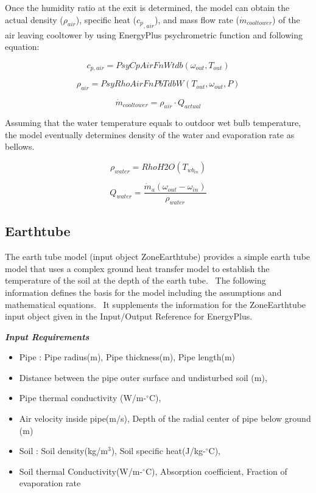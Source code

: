 Once the humidity ratio at the exit is determined, the model can obtain the actual density (\({\rho_{air}}\)), specific heat (\({c_p}_{,air}\)), and mass flow rate (\({\dot m_{cooltower}}\)) of the air leaving cooltower by using EnergyPlus psychrometric function and following equation:

\begin{equation}
{c_{p,air}} = PsyCpAirFnWtdb({\omega_{out}},{T_{out}})
\end{equation}

\begin{equation}
{\rho_{air}} = PsyRhoAirFnPbTdbW({T_{out}},{\omega_{out}},P)
\end{equation}

\begin{equation}
{\dot m_{cooltower}} = {\rho_{air}} \cdot {Q_{actual}}
\end{equation}

Assuming that the water temperature equals to outdoor wet bulb temperature, the model eventually determines density of the water and evaporation rate as bellows.

\begin{equation}
{\rho_{water}} = RhoH2O({T_{w{b_{in}}}})
\end{equation}

\begin{equation}
{Q_{water}} = \frac{{{{\dot m}_a}({\omega_{out}} - {\omega_{in}})}}{{{\rho_{water}}}}
\end{equation}

\subsection{Earthtube}\label{earthtube}

The earth tube model (input object ZoneEarthtube) provides a simple earth tube model that uses a complex ground heat transfer model to establish the temperature of the soil at the depth of the earth tube.~ The following information defines the basis for the model including the assumptions and mathematical equations.~ It supplements the information for the ZoneEarthtube input object given in the Input/Output Reference for EnergyPlus.

\emph{\textbf{Input Requirements}}

\begin{itemize}
\tightlist
\item Pipe : Pipe radius(m), Pipe thickness(m), Pipe length(m)
\item Distance between the pipe outer surface and undisturbed soil (m),
\item Pipe thermal conductivity (W/m-\(^{\circ}\)C),
\item Air velocity inside pipe(m/s), Depth of the radial center of pipe below ground (m)
\item Soil : Soil density(kg/m\(^{3}\)), Soil specific heat(J/kg-\(^{\circ}\)C),
\item Soil thermal Conductivity(W/m-\(^{\circ}\)C), Absorption coefficient, Fraction of evaporation rate
\end{itemize}

